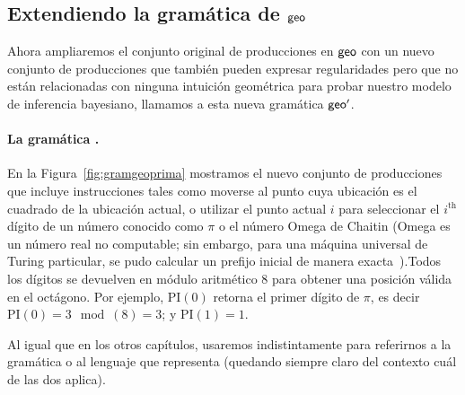 \subsection{Extendiendo la gramática de ${\sf geo}$}


Ahora ampliaremos el conjunto original de producciones en ${\sf geo}$ con un nuevo conjunto de producciones que también pueden expresar regularidades pero que no están relacionadas con ninguna intuición geométrica para probar nuestro modelo de inferencia bayesiano, llamamos a esta nueva gramática ${\sf geo'}$.


\paragraph{La gramática \gramgeoprima.}

En la Figura~\ref{fig:gramgeoprima} mostramos el nuevo conjunto de producciones que incluye instrucciones tales como moverse al punto cuya ubicación es el cuadrado de la ubicación actual, o utilizar el punto actual $i$ para seleccionar el $i^\text{th}$dígito de un número conocido como $\pi$ o el número Omega de Chaitin (Omega es un número real no computable; sin embargo, para una máquina universal de Turing particular, se pudo calcular un prefijo inicial de manera exacta~\cite{calude2002computing}).Todos los dígitos se devuelven en módulo aritmético 8 para obtener una posición válida en el octágono. Por ejemplo, $\textrm{PI}(0)$ retorna el primer dígito de $\pi$, es decir $\textrm{PI}(0)= 3 \mod({8}) = 3$; y $\textrm{PI}(1) = 1$.


Al igual que en los otros capítulos, usaremos indistintamente \gramgeoprima para referirnos a la gramática o al lenguaje que representa (quedando siempre claro del contexto cuál de las dos aplica).


